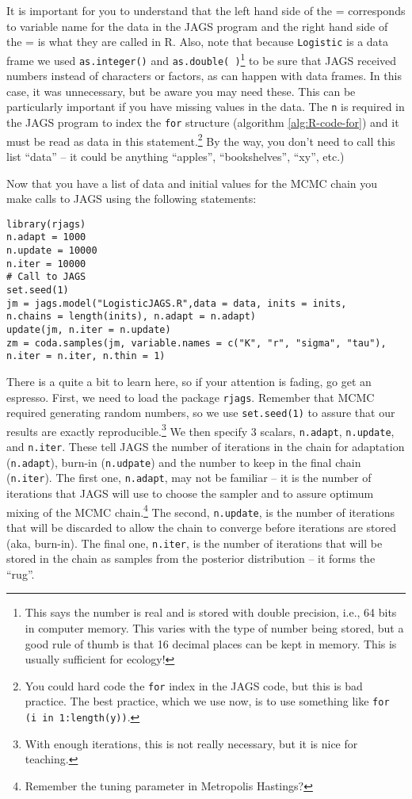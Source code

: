 \documentclass[12pt,english]{article}
\begin{document}
It is important for you to understand that the left hand side of the = corresponds to variable name for the data in the JAGS program and the right hand side of the = is what they are called in R. Also, note that because \texttt{Logistic} is a data frame we used \texttt{as.integer()} and \texttt{as.double( )}\footnote{This says the number is real and is stored with double precision, i.e., 64 bits in computer memory. This varies with the type of number being stored, but a good rule of thumb is that 16 decimal places can be kept in memory. This is usually sufficient for ecology!} to be sure that JAGS received numbers instead of characters or factors, as can happen with data frames. In this case, it was unnecessary, but be aware you may need these. This can be particularly important if you have missing values in the data. The \texttt{n} is required in the JAGS program to index the \texttt{for} structure (algorithm \ref{alg:R-code-for}) and it must be read as data in this statement.\footnote{You could hard code the \texttt{for} index in the JAGS code, but this is bad practice. The best practice, which we use now, is to use something like \texttt{for (i in 1:length(y))}.} By the way, you don't need to call this list \enquote{data} -- it could be anything \enquote{apples}, \enquote{bookshelves}, \enquote{xy}, etc.) 

Now that you have a list of data and initial values for the MCMC chain you make calls to JAGS using the following statements:

\begin{Verbatim}
library(rjags)
n.adapt = 1000
n.update = 10000
n.iter = 10000
# Call to JAGS
set.seed(1)
jm = jags.model("LogisticJAGS.R",data = data, inits = inits, 
n.chains = length(inits), n.adapt = n.adapt)
update(jm, n.iter = n.update)
zm = coda.samples(jm, variable.names = c("K", "r", "sigma", "tau"),
n.iter = n.iter, n.thin = 1)
\end{Verbatim}

\noindent There is a quite a bit to learn here, so if your attention is fading, go get an espresso. First, we need to load the package \texttt{rjags}. Remember that MCMC required generating random numbers, so we use \texttt{set.seed(1)} to assure that our results are exactly reproducible.\footnote{With enough iterations, this is not really necessary, but it is nice for teaching.} We then specify 3 scalars, \texttt{n.adapt},  \texttt{n.update}, and \texttt{n.iter}. These tell JAGS the number of iterations in the chain for adaptation (\texttt{n.adapt}), burn-in (\texttt{n.udpate}) and the number to keep in the final chain (\texttt{n.iter}). The first one, \texttt{n.adapt}, may not be familiar -- it is the number of iterations that JAGS will use to choose the sampler and to assure optimum mixing of the MCMC chain.\footnote{Remember the tuning parameter in Metropolis Hastings?} The second, \texttt{n.update}, is the number of iterations that will be discarded to allow the chain to converge before iterations are stored (aka, burn-in). The final one, \texttt{n.iter}, is the number of iterations that will be stored in the chain as samples from the posterior distribution -- it forms the \enquote{rug}.
\end{document}
